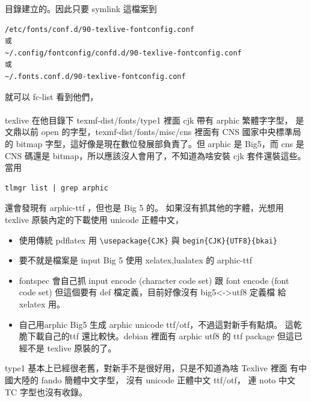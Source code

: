目錄建立的。因此只要 symlink 這檔案到
\begin{verbatim}
/etc/fonts/conf.d/90-texlive-fontconfig.conf
或
~/.config/fontconfig/confd.d/90-texlive-fontconfig.conf
或
~/.fonts.conf.d/90-texlive-fontconfig.conf
\end{verbatim}
就可以 fc-list 看到他們，
\\\\
texlive 在他目錄下 texmf-dist/fonts/type1 裡面 cjk 帶有 arphic 繁體字字型，
是文鼎以前 open 的字型，texmf-dist/fonts/misc/cns 裡面有 CNS 國家中央標準局
的 bitmap 字型，這好像是現在數位發展部負責了。但 arphic 是 Big5，而 cns 是
CNS 碼還是 bitmap，所以應該沒人會用了，不知道為啥安裝 cjk 套件還裝這些。
當用
\begin{verbatim}
tlmgr list | grep arphic
\end{verbatim}
還會發現有 arphic-ttf ，但也是 Big 5 的。 如果沒有抓其他的字體，光想用
texlive 原裝內定的下載使用 unicode 正體中文，
\begin{itemize}
  \item 使用傳統 pdflatex 用 \verb=\usepackage{CJK}= 與
    \verb=begin{CJK}{UTF8}{bkai}=
  \item 要不就是檔案是 input Big 5 使用 xelatex,lualatex 的 arphic-ttf
  \item fontspec 會自己抓 input encode (character code set) 跟 font encode 
    (font code set) 但這個要有 def 檔定義，目前好像沒有 big5<->utf8 定義檔
    給 xelatex 用。
  \item 自己用arphic Big5 生成 arphic unicode ttf/otf，不過這對新手有點煩。
    這乾脆下載自己的ttf 還比較快。debian 裡面有 arphic utf8 的 ttf package
    但這已經不是 texlive 原裝的了。
\end{itemize}
type1 基本上已經很老舊，對新手不是很好用，只是不知道為啥 Texlive 裡面
有中國大陸的 fando 簡體中文字型， 沒有 unicode 正體中文 ttf/otf，
連 noto 中文 TC 字型也沒有收錄。

